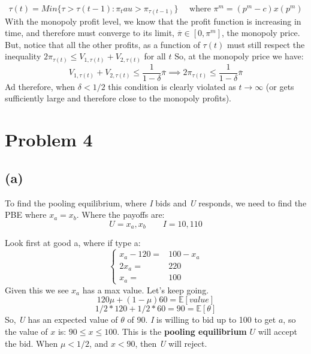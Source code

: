 \documentclass{article}
\begin{document}
\[
\tau(t) = Min\{ \tau > \tau(t-1): \pi_tau > \pi_{\tau(t-1)} \} \quad \text{ where } \pi^m = (p^m - c)x(p^m)
\]
With the monopoly profit level, we know that the profit function is increasing in time, and therefore must converge to its limit, $\overline{\pi} \in [0, \pi^m]$, the monopoly price. But, notice that all the other profits, as a function of $\tau(t)$ must still respect the inequality $2\pi_{\tau(t)} \leq V_{1,\tau(t)} + V_{2,\tau(t)}$ for all $t$ So, at the monopoly price we have:
\[
V_{1,\tau(t)} + V_{2,\tau(t)} \leq \frac{1}{1-\delta}\overline{\pi} \implies 2\pi_{\tau(t)} \leq \frac{1}{1-\delta}\overline{\pi}
\]
Ad therefore, when $\delta < 1/2$ this condition is clearly violated as $t \rightarrow \infty$ (or gets sufficiently large and therefore close to the monopoly profits). 

\section{Problem 4}
\subsection*{(a)}

To find the pooling equilibrium, where \textit{I} bids and \textit{U} responds, we need to find the PBE where $x_a = x_b$. Where the payoffs are:
\[ 
U = x_a, x_b \qquad I= 10, 110 \]

Look first at good a, where if type a:
\[
\left\{
  \begin{array}{ll}
    x_a - 120 = & 100 - x_a\\
    2x_a = & 220 \\
    x_a = & 100
    \end{array}
\right.
\]
Given this we see $x_a$ has a max value. Let's keep going. 
\[
120\mu + (1-\mu)60 = \mathbb{E}[value]
\]
\[
1/2*120 + 1/2*60 = 90 = \mathbb{E}[\theta]
\]
So, \textit{U} has an expected value of $\theta$ of 90. \textit{I} is willing to bid up to 100 to get $a$, so the value of $x$ is: $90 \leq x \leq 100$. This is the \textbf{pooling equilibrium} $U$ will accept the bid. When $\mu < 1/2$, and $x < 90$, then \textit{U} will reject. 
\end{document}
